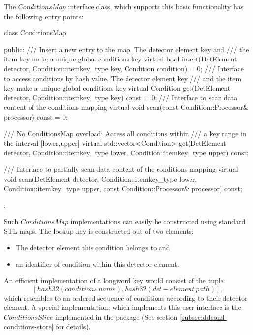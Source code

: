 \documentclass[10pt,a4paper]{article}
\begin{document}
\noindent
The $ConditionsMap$ interface class, which supports this basic functionality
has the following entry points:
\begin{unnumberedcode}
  class ConditionsMap   {
  public:
    /// Insert a new entry to the map. The detector element key and 
    /// the item key make a unique global conditions key
    virtual bool insert(DetElement         detector,
                        Condition::itemkey_type key,
                        Condition          condition) = 0;
    /// Interface to access conditions by hash value. The detector element key 
    /// and the item key make a unique global conditions key
    virtual Condition get(DetElement              detector,
                          Condition::itemkey_type key) const = 0;
    /// Interface to scan data content of the conditions mapping
    virtual void scan(const Condition::Processor& processor) const = 0;

    /// No ConditionsMap overload: Access all conditions within 
    /// a key range in the interval [lower,upper]
    virtual std::vector<Condition> get(DetElement              detector,
                                       Condition::itemkey_type lower,
                                       Condition::itemkey_type upper)  const;
      
    /// Interface to partially scan data content of the conditions mapping
    virtual void scan(DetElement                  detector,
                      Condition::itemkey_type     lower,
                      Condition::itemkey_type     upper,
                      const Condition::Processor& processor) const;
  };
\end{unnumberedcode}
Such $ConditionsMap$ implementations can easily be constructed using standard
STL maps. The lookup key is constructed out of two elements:
\begin{itemize}\itemcompact
\item The detector element this condition belongs to and 
\item an identifier of condition within this detector element.
\end{itemize}
An efficient implementation of a longword key would consist of the tuple:
$$
[ hash32(conditions\ name) , hash32(det-element\ path) ],
$$
which resembles to an ordered sequence of conditions according to 
their detector element. A special implementation, which implements 
this user interface is the $ConditionsSlice$ implemented in the 
\DDC package (See section \ref{subsec:ddcond-conditions-store} for details).
\end{document}
